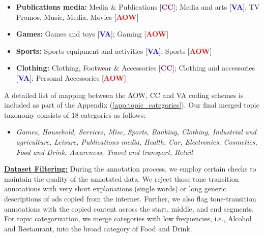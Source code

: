 \begin{itemize}
    \item \textbf{Publications media:} Media \& Publications  [\textcolor{purple}{\textbf{CC}}]; Media and arts [\textcolor{blue}{\textbf{VA}}]; TV Promos, Music, Media, Movies [\textcolor{red}{\textbf{AOW}}]
    \item \textbf{Games:} Games and toys [\textcolor{blue}{\textbf{VA}}]; Gaming [\textcolor{red}{\textbf{AOW}}]
    \item \textbf{Sports:} Sports equipment and activities [\textcolor{blue}{\textbf{VA}}]; Sports [\textcolor{red}{\textbf{AOW}}]
    \item \textbf{Clothing:} Clothing, Footwear \& Accessories [\textcolor{purple}{\textbf{CC}}]; Clothing and accessories [\textcolor{blue}{\textbf{VA}}]; Personal Accessories [\textcolor{red}{\textbf{AOW}}]
\end{itemize}
A detailed list of mapping between the AOW, CC and VA coding schemes is included as part of the Appendix (\ref{app:topic_categories}). Our final merged topic taxonomy consists of 18 categories as follows:
\begin{itemize}
    \item \textit{Games, Household, Services, Misc, Sports, Banking, Clothing, Industrial and agriculture, Leisure, Publications media, Health, Car, Electronics, Cosmetics, Food and Drink, Awareness, Travel and transport, Retail}
\end{itemize}
\textbf{\underline{Dataset Filtering:}} During the annotation process, we employ certain checks to maintain the quality of the annotated data. We reject those tone transition annotations with very short explanations (single words) or long generic descriptions of ads copied from the internet. Further, we also flag tone-transition annotations with the copied content across the start, middle, and end segments. For topic categorization, we merge categories with low frequencies, i.e., Alcohol and Restaurant, into the broad category of Food and Drink.
